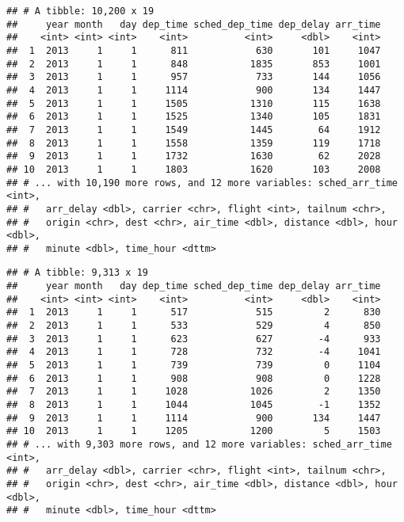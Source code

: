 \documentclass[]{article}
\newenvironment{Shaded}{\begin{snugshade}}{\end{snugshade}}
\newcommand{\KeywordTok}[1]{\textcolor[rgb]{0.13,0.29,0.53}{\textbf{#1}}}
\newcommand{\StringTok}[1]{\textcolor[rgb]{0.31,0.60,0.02}{#1}}
\newcommand{\CommentTok}[1]{\textcolor[rgb]{0.56,0.35,0.01}{\textit{#1}}}
\newcommand{\OperatorTok}[1]{\textcolor[rgb]{0.81,0.36,0.00}{\textbf{#1}}}
\newcommand{\NormalTok}[1]{#1}
\begin{document}
\begin{verbatim}
## # A tibble: 10,200 x 19
##     year month   day dep_time sched_dep_time dep_delay arr_time
##    <int> <int> <int>    <int>          <int>     <dbl>    <int>
##  1  2013     1     1      811            630       101     1047
##  2  2013     1     1      848           1835       853     1001
##  3  2013     1     1      957            733       144     1056
##  4  2013     1     1     1114            900       134     1447
##  5  2013     1     1     1505           1310       115     1638
##  6  2013     1     1     1525           1340       105     1831
##  7  2013     1     1     1549           1445        64     1912
##  8  2013     1     1     1558           1359       119     1718
##  9  2013     1     1     1732           1630        62     2028
## 10  2013     1     1     1803           1620       103     2008
## # ... with 10,190 more rows, and 12 more variables: sched_arr_time <int>,
## #   arr_delay <dbl>, carrier <chr>, flight <int>, tailnum <chr>,
## #   origin <chr>, dest <chr>, air_time <dbl>, distance <dbl>, hour <dbl>,
## #   minute <dbl>, time_hour <dttm>
\end{verbatim}

\begin{Shaded}
\end{Shaded}

\begin{verbatim}
## # A tibble: 9,313 x 19
##     year month   day dep_time sched_dep_time dep_delay arr_time
##    <int> <int> <int>    <int>          <int>     <dbl>    <int>
##  1  2013     1     1      517            515         2      830
##  2  2013     1     1      533            529         4      850
##  3  2013     1     1      623            627        -4      933
##  4  2013     1     1      728            732        -4     1041
##  5  2013     1     1      739            739         0     1104
##  6  2013     1     1      908            908         0     1228
##  7  2013     1     1     1028           1026         2     1350
##  8  2013     1     1     1044           1045        -1     1352
##  9  2013     1     1     1114            900       134     1447
## 10  2013     1     1     1205           1200         5     1503
## # ... with 9,303 more rows, and 12 more variables: sched_arr_time <int>,
## #   arr_delay <dbl>, carrier <chr>, flight <int>, tailnum <chr>,
## #   origin <chr>, dest <chr>, air_time <dbl>, distance <dbl>, hour <dbl>,
## #   minute <dbl>, time_hour <dttm>
\end{verbatim}
\end{document}
